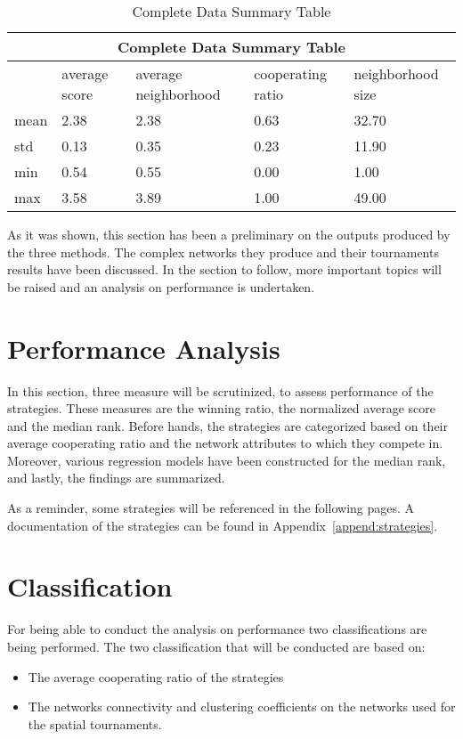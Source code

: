 \begin{table}[!hbtp]
	\centering
	\begin{adjustbox}{width=0.8\textwidth}
		\small
		\begin{tabular}{|l|l|l|l|l|}
			\hline
			\multicolumn{5}{|c|}{Complete Data Summary Table}                                      \\ \hline
			     & average score & average neighborhood & cooperating ratio & neighborhood size \\ \hline
			mean & 2.38          & 2.38                 & 0.63              & 32.70             \\ \hline
			std  & 0.13          & 0.35                 & 0.23              & 11.90             \\ \hline
			min  & 0.54          & 0.55                 & 0.00              & 1.00              \\ \hline
			max  & 3.58          & 3.89                 & 1.00              & 49.00             \\ \hline
		\end{tabular}
	\end{adjustbox}
	\caption{Complete Data Summary Table}
	\label{table:summary-complete-data}
\end{table}

As it was shown, this section has been a preliminary on the outputs produced by
the three methods. The complex networks they produce and their tournaments
results have been discussed. In the section to follow, more important topics will
be raised and an analysis on performance is undertaken.

\section{Performance Analysis}
\label{performance-analysis}
In this section, three measure will be scrutinized, to assess performance of the
strategies. These measures are the winning ratio, the normalized average score
and the median rank. Before hands, the strategies are categorized based on their
average cooperating ratio and the network attributes to which they compete in. Moreover,
various regression models have been constructed for the median rank, and lastly,
the findings are summarized.

As a reminder, some strategies will be referenced in the following pages. A
documentation of the strategies can be found in Appendix~\ref{append:strategies}.

\section{Classification}
\label{sub:classification}
For being able to conduct the analysis on performance two classifications are
being performed. The two classification that will be conducted are based on:
\begin{itemize}
	\item The average cooperating ratio of the strategies
	\item The networks connectivity and clustering coefficients on the networks
	      used for the spatial tournaments.
\end{itemize}


